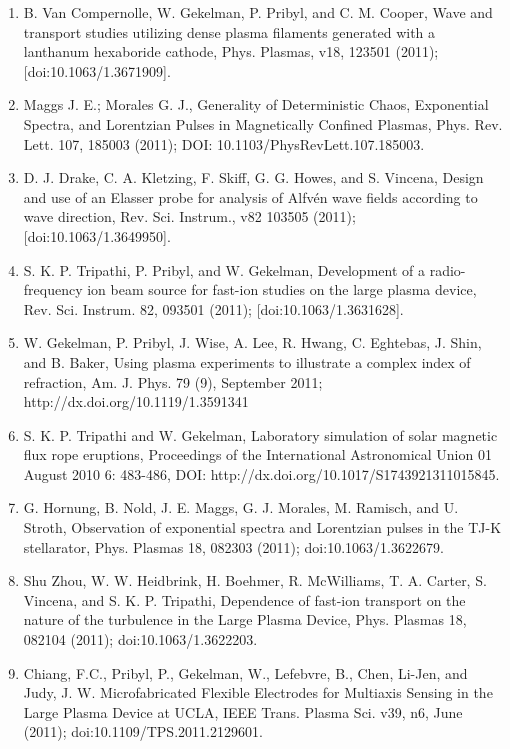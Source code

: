 \documentclass[11pt]{article}
\begin{document}
\begin{enumerate}
\item   B. Van Compernolle, W. Gekelman, P. Pribyl, and C. M. Cooper, Wave and transport studies utilizing dense plasma filaments generated with a lanthanum hexaboride cathode, Phys. Plasmas, v18, 123501 (2011); [doi:10.1063/1.3671909].

\item  Maggs J. E.; Morales G. J., Generality of Deterministic Chaos, Exponential Spectra, and Lorentzian Pulses in Magnetically Confined Plasmas, Phys. Rev. Lett. 107, 185003 (2011); DOI: 10.1103/PhysRevLett.107.185003.

\item  D. J. Drake, C. A. Kletzing, F. Skiff, G. G. Howes, and S. Vincena, Design and use of an Elasser probe for analysis of Alfv\'{e}n wave fields according to wave direction, Rev. Sci. Instrum., v82 103505 (2011); [doi:10.1063/1.3649950].

\item   S. K. P. Tripathi, P. Pribyl, and W. Gekelman, Development of a radio-frequency ion beam source for fast-ion studies on the large plasma device, Rev. Sci. Instrum. 82, 093501 (2011); [doi:10.1063/1.3631628].

\item   W. Gekelman, P. Pribyl, J. Wise, A. Lee, R. Hwang, C. Eghtebas, J. Shin, and B. Baker, Using plasma experiments to illustrate a complex index of refraction, Am. J. Phys. 79 (9), September 2011; http://dx.doi.org/10.1119/1.3591341

\item   S. K. P. Tripathi and W. Gekelman, Laboratory simulation of solar magnetic flux rope eruptions, Proceedings of the International Astronomical Union 01 August 2010 6: 483-486, DOI: http://dx.doi.org/10.1017/S1743921311015845.

\item   G. Hornung, B. Nold, J. E. Maggs, G. J. Morales, M. Ramisch, and U. Stroth, Observation of exponential spectra and Lorentzian pulses in the TJ-K stellarator, Phys. Plasmas 18, 082303 (2011); doi:10.1063/1.3622679.

\item  Shu Zhou, W. W. Heidbrink, H. Boehmer, R. McWilliams, T. A. Carter, S. Vincena, and S. K. P. Tripathi, Dependence of fast-ion transport on the nature of the turbulence in the Large Plasma Device, Phys. Plasmas 18, 082104 (2011); doi:10.1063/1.3622203.

\item  Chiang, F.C., Pribyl, P., Gekelman, W., Lefebvre, B., Chen, Li-Jen, and Judy, J. W. Microfabricated Flexible Electrodes for Multiaxis Sensing in the Large Plasma Device at UCLA, IEEE Trans. Plasma Sci. v39, n6, June (2011); doi:10.1109/TPS.2011.2129601.


\end{enumerate}
\end{document}
